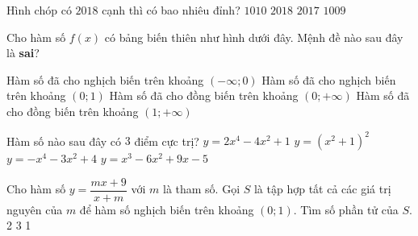 \begin{ex}%
	Hình chóp có $2018$ cạnh thì có bao nhiêu đỉnh?
	\choice
	{\True $1010$}
	{$2018$}
	{$2017$}
	{$1009$}
	
\end{ex}

\begin{ex}%
	Cho hàm số $f(x)$ có bảng biến thiên như hình dưới đây. Mệnh đề nào sau đây là \textbf{sai}?
	\begin{center}
	\end{center}
	\choice
	{Hàm số đã cho nghịch biến trên khoảng $(-\infty;0)$}
	{Hàm số đã cho nghịch biến trên khoảng $(0;1)$}
	{\True Hàm số đã cho đồng biến trên khoảng $(0;+\infty)$}
	{Hàm số đã cho đồng biến trên khoảng $(1;+\infty)$}
\end{ex}

\begin{ex}%
	Hàm số nào sau đây có $3$ điểm cực trị?
	\choice
	{\True $y=2x^4-4x^2+1$}
	{$y=\left(x^2+1\right)^2$}
	{$y=-x^4-3x^2+4$}
	{$y=x^3-6x^2+9x-5$}
\end{ex}

\begin{ex}%
	Cho hàm số $y=\dfrac{mx+9}{x+m}$ với $m$ là tham số. Gọi $S$ là tập hợp tất cả các giá trị nguyên của $m$ để hàm số nghịch biến trên khoảng $(0;1)$. Tìm số phần tử của $S$.
	\choice
	{}
	{2}
	{3}
	{1}
\end{ex}

